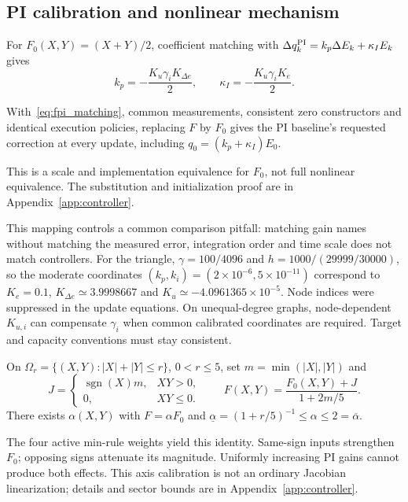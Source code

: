 \subsection{PI calibration and nonlinear mechanism}
\label{subsec:fpi_calibration}
For $F_0(X,Y)=(X+Y)/2$, coefficient matching with
$\Delta q_k^{\rm PI}=k_p\Delta E_k+\kappa_I E_k$ gives
\begin{equation}
 k_p=-\frac{K_u\gamma_iK_{\Delta e}}2,\qquad
 \kappa_I=-\frac{K_u\gamma_iK_e}2.
 \label{eq:fpi_matching}
\end{equation}
\begin{btdproposition}
\label{prop:fpi_equivalence}
With~\eqref{eq:fpi_matching}, common measurements, consistent zero
constructors and identical execution policies, replacing $F$ by $F_0$
gives the PI baseline's requested correction at every update, including
$q_0=(k_p+\kappa_I)E_0$.
\end{btdproposition}
This is a scale and implementation equivalence for $F_0$, not full
nonlinear equivalence. The substitution and initialization proof are
in Appendix~\ref{app:controller}.

This mapping controls a common comparison pitfall: matching gain names
without matching the measured error, integration order and time scale
does not match controllers. For the triangle, $\gamma=100/4096$ and
$h=1000/(29999/30000)$, so the moderate coordinates
$(k_p,k_i)=(2\times10^{-6},5\times10^{-11})$ correspond to
$K_e=0.1$, $K_{\Delta e}\simeq3.9998667$ and
$K_u\simeq-4.0961365\times10^{-5}$. Node indices were suppressed
in the update equations. On unequal-degree graphs, node-dependent
$K_{u,i}$ can compensate $\gamma_i$ when common calibrated coordinates
are required. Target and capacity conventions must stay consistent.

\begin{btdproposition}
\label{prop:fpi_central}
On $\Omega_r=\{(X,Y):|X|+|Y|\le r\}$, $0<r\le5$, set
$m=\min(|X|,|Y|)$ and
\begin{equation}
 J=\begin{cases}\operatorname{sgn}(X)m,&XY>0,\\0,&XY\le0.\end{cases}
 \qquad F(X,Y)=\frac{F_0(X,Y)+J}{1+2m/5}.
 \label{eq:fpi_central}
\end{equation}
There exists $\alpha(X,Y)$ with $F=\alpha F_0$ and
$\underline\alpha=(1+r/5)^{-1}\le\alpha\le2=\overline\alpha$.
\end{btdproposition}
The four active min-rule weights yield this identity. Same-sign
inputs strengthen $F_0$; opposing signs attenuate its magnitude.
Uniformly increasing PI gains cannot produce both effects. This
axis calibration is not an ordinary Jacobian linearization; details
and sector bounds are in Appendix~\ref{app:controller}.

